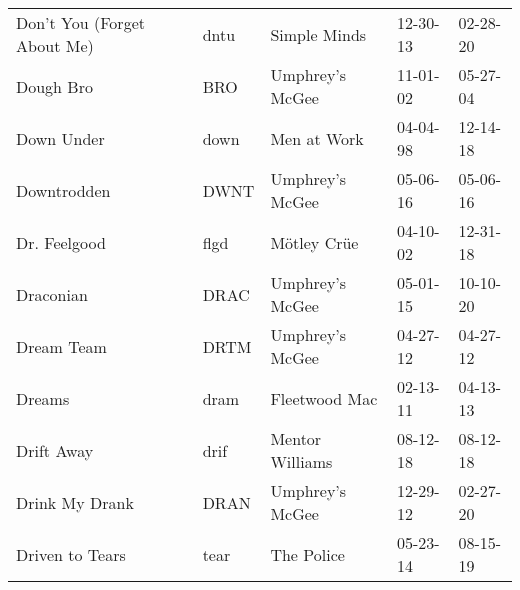 \begin{longtable}{p{}p{}p{}p{}p{}}
                                             Don't You (Forget About Me) &          dntu &                                             Simple Minds &              12-30-13 &             02-28-20 \\
                                                               Dough Bro &           BRO &                                          Umphrey's McGee &              11-01-02 &             05-27-04 \\
                                                              Down Under &          down &                                              Men at Work &              04-04-98 &             12-14-18 \\
                                                             Downtrodden &          DWNT &                                          Umphrey's McGee &              05-06-16 &             05-06-16 \\
                                                            Dr. Feelgood &          flgd &                                              Mötley Crüe &              04-10-02 &             12-31-18 \\
                                                               Draconian &          DRAC &                                          Umphrey's McGee &              05-01-15 &             10-10-20 \\
                                                              Dream Team &          DRTM &                                          Umphrey's McGee &              04-27-12 &             04-27-12 \\
                                                                  Dreams &          dram &                                            Fleetwood Mac &              02-13-11 &             04-13-13 \\
                                                              Drift Away &          drif &                                          Mentor Williams &              08-12-18 &             08-12-18 \\
                                                          Drink My Drank &          DRAN &                                          Umphrey's McGee &              12-29-12 &             02-27-20 \\
                                                         Driven to Tears &          tear &                                               The Police &              05-23-14 &             08-15-19 \\

\end{longtable}
